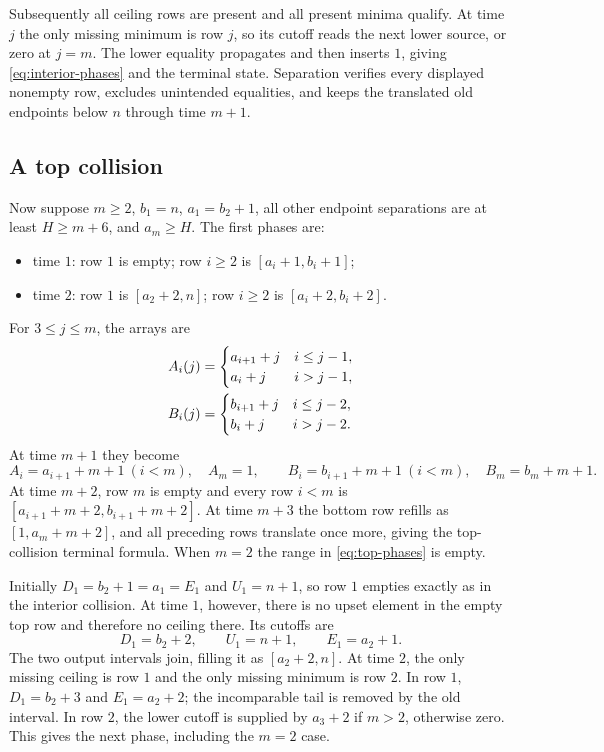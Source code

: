 Subsequently all ceiling rows are present and all present minima qualify. At time $j$ the only missing minimum is row $j$, so its cutoff reads the next lower source, or zero at $j=m$. The lower equality propagates and then inserts $1$, giving \eqref{eq:interior-phases} and the terminal state. Separation verifies every displayed nonempty row, excludes unintended equalities, and keeps the translated old endpoints below $n$ through time $m+1$.

\subsection{A top collision}
Now suppose $m\ge2$, $b_1=n$, $a_1=b_2+1$, all other endpoint separations are at least $H\ge m+6$, and $a_m\ge H$. The first phases are:
\begin{itemize}
\item time $1$: row $1$ is empty; row $i\ge2$ is $[a_i+1,b_i+1]$;
\item time $2$: row $1$ is $[a_2+2,n]$; row $i\ge2$ is $[a_i+2,b_i+2]$.
\end{itemize}
For $3\le j\le m$, the arrays are
\begin{align}
 A_i(j)&=\begin{cases}a_{i+1}+j&i\le j-1,\\a_i+j&i>j-1,\end{cases}\label{eq:top-phases}\\
 B_i(j)&=\begin{cases}b_{i+1}+j&i\le j-2,\\b_i+j&i>j-2.\end{cases}\notag
\end{align}
At time $m+1$ they become
\[
 A_i=a_{i+1}+m+1\ (i<m),\quad A_m=1,\qquad
 B_i=b_{i+1}+m+1\ (i<m),\quad B_m=b_m+m+1.
\]
At time $m+2$, row $m$ is empty and every row $i<m$ is $[a_{i+1}+m+2,b_{i+1}+m+2]$. At time $m+3$ the bottom row refills as $[1,a_m+m+2]$, and all preceding rows translate once more, giving the top-collision terminal formula. When $m=2$ the range in \eqref{eq:top-phases} is empty.

Initially $D_1=b_2+1=a_1=E_1$ and $U_1=n+1$, so row $1$ empties exactly as in the interior collision. At time $1$, however, there is no upset element in the empty top row and therefore no ceiling there. Its cutoffs are
\[
 D_1=b_2+2,\qquad U_1=n+1,\qquad E_1=a_2+1.
\]
The two output intervals join, filling it as $[a_2+2,n]$. At time $2$, the only missing ceiling is row $1$ and the only missing minimum is row $2$. In row $1$, $D_1=b_2+3$ and $E_1=a_2+2$; the incomparable tail is removed by the old interval. In row $2$, the lower cutoff is supplied by $a_3+2$ if $m>2$, otherwise zero. This gives the next phase, including the $m=2$ case.

